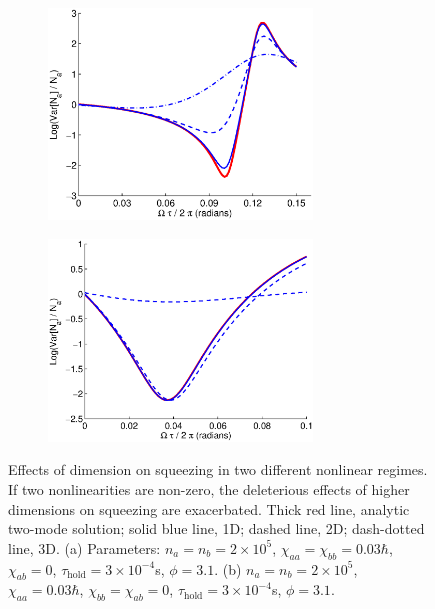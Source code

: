 \documentclass{iopart}
\begin{document}
\begin{figure}
  \centering
  \begin{subfigure}{.5\textwidth}
    \centering
    \includegraphics[width=7cm]{figures/dimensional_effects_on_squeezing_1.eps}
    \label{figDimensionalSqueezingEffects:sub1}
  \end{subfigure}%
  \begin{subfigure}{.5\textwidth}
    \centering
    \includegraphics[width=7cm]{figures/dimensional_effects_on_squeezing_2.eps}
    \label{figDimensionalSqueezingEffects:sub2}
  \end{subfigure}
\caption{Effects of dimension on squeezing in two different nonlinear regimes. If two nonlinearities are non-zero, the deleterious effects of higher dimensions on squeezing are exacerbated. Thick red line, analytic two-mode solution; solid blue line, 1D; dashed line, 2D; dash-dotted line, 3D. (a) Parameters: $n_a = n_b =2 \times 10^5$, $\chi_{aa}=\chi_{bb}=0.03\hbar$, $\chi_{ab}=0$, $\tau_{\mathrm{hold}}=3\times 10^{-4}$s, $\phi=3.1$. (b) $n_a = n_b =2 \times 10^5$, $\chi_{aa}=0.03\hbar$, $\chi_{bb}=\chi_{ab}=0$, $\tau_{\mathrm{hold}}=3\times 10^{-4}$s, $\phi=3.1$.}
  \label{figDimensionalSqueezingEffects}
\end{figure}
\end{document}

